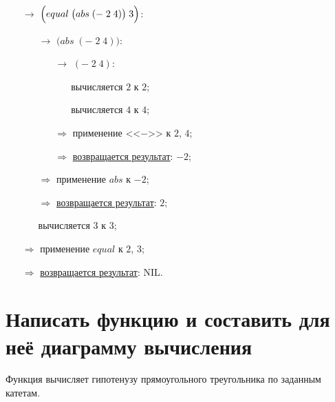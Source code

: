 \begin{itemize}
	\item[$\longrightarrow$] $\Bigl(equal\; \bigl(abs\; (-\; 2\; 4)\bigr)\; 3\Bigr)$:
	\begin{itemize}
		\item[$\longrightarrow$] $\bigl(abs\; (-\; 2\; 4)\bigr)$:
		\begin{itemize}
			\item[$\longrightarrow$] $(-\; 2\; 4)$:
			\begin{itemize}
				\item[\textbullet] вычисляется $2$ к $2$;
				\item[\textbullet] вычисляется $4$ к $4$;
			\end{itemize}
			\item[$\Longrightarrow$] применение <<$-$>> к $2$, $4$;
			\item[$\Longrightarrow$] \underline{возвращается результат}: $-2$;
		\end{itemize}
		\item[$\Longrightarrow$] применение $abs$ к $-2$;
		\item[$\Longrightarrow$] \underline{возвращается результат}: $2$;
		\item[\textbullet] вычисляется $3$ к $3$;
	\end{itemize}
	\item[$\Longrightarrow$] применение $equal$ к $2$, $3$;
	\item[$\Longrightarrow$] \underline{возвращается результат}: NIL.
\end{itemize}



\newpage
\section{Написать функцию и составить для неё диаграмму вычисления}

\problem Функция вычисляет гипотенузу прямоугольного треугольника по заданным катетам.


